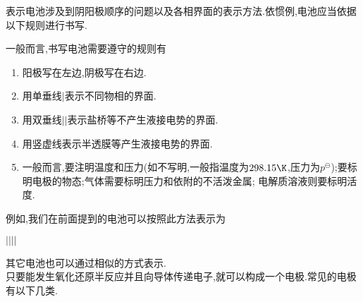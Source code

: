 \documentclass{ctexart}
\begin{document}
\indent 表示电池涉及到阴阳极顺序的问题以及各相界面的表示方法.依惯例,电池应当依据以下规则进行书写.
\begin{theorem}[6A.2.3 电池的书写方法]
    一般而言,书写电池需要遵守的规则有
    \begin{enumerate}[topsep=0pt,parsep=0pt,itemsep=0pt,partopsep=0pt,label=\tbf{\arabic*.},leftmargin=*]
        \item 阳极写在左边,阴极写在右边.
        \item 用单垂线$\vert$表示不同物相的界面.
        \item 用双垂线$\vert\vert$表示盐桥等不产生液接电势的界面.
        \item 用竖虚线\hspace{1.5pt}\hspace{1.5pt}表示半透膜等产生液接电势的界面.
        \item 一般而言,要注明温度和压力(如不写明,一般指温度为$298.15\K$,压力为$p^\ominus$);要标明电极的物态;气体需要标明压力和依附的不活泼金属;%
            电解质溶液则要标明活度.
    \end{enumerate}
\end{theorem}
例如,我们在前面提到的电池可以按照此方法表示为
\begin{tightcenter}
    $\vert$$\vert\vert$$\vert$
\end{tightcenter}
其它电池也可以通过相似的方式表示.\vspace{4pt}\\
\indent 只要能发生氧化还原半反应并且向导体传递电子,就可以构成一个电极.常见的电极有以下几类.
\end{document}
